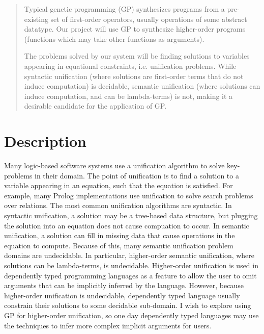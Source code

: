 \documentclass{article}
\begin{document}
\maketitle

\begin{abstract}
Typical genetic programming (GP) synthesizes programs from a pre-existing
set of first-order operators, usually operations of some abstract
datatype. Our project will use GP to synthesize higher-order programs
(functions which may take other functions as arguments). 

The problems solved by our system will be finding solutions to
variables appearing in equational constraints, i.e. unification
problems. While syntactic unification (where solutions are
first-order terms that do not induce computation) is decidable,
semantic unification (where solutions can induce computation, and can
be lambda-terms) is not, making it a desirable candidate
for the application of GP.
\end{abstract}

\section{Description}
Many logic-based software systems use a unification algorithm to solve
key-problems in their domain. The point of unification is to find a
solution to a variable appearing in an equation, such that the
equation is satisfied.
For example, many Prolog implementations
use unification to solve search problems over relations. The most
common unification algorithms are syntactic. In syntactic unification,
a solution may be a tree-based data structure, but plugging the
solution into an equation does not cause compuation to occur. In
semantic unification, a solution can fill in missing data that cause
operations in the equation to compute. Because of this, many semantic
unification problem domains are undecidable. In particular,
higher-order semantic unification, where solutions can be
lambda-terms, is undecidable. Higher-order unification is used in
dependently typed programming languages as a feature to allow the user
to omit arguments that can be implicitly inferred by the language.
However, because higher-order unification is undecidable, dependently
typed language usually constrain their solutions to some decidable
sub-domain. I wish to explore using GP for higher-order unification,
so one day dependently typed languages may use the techniques to infer
more complex implicit arguments for users.
\end{document}
